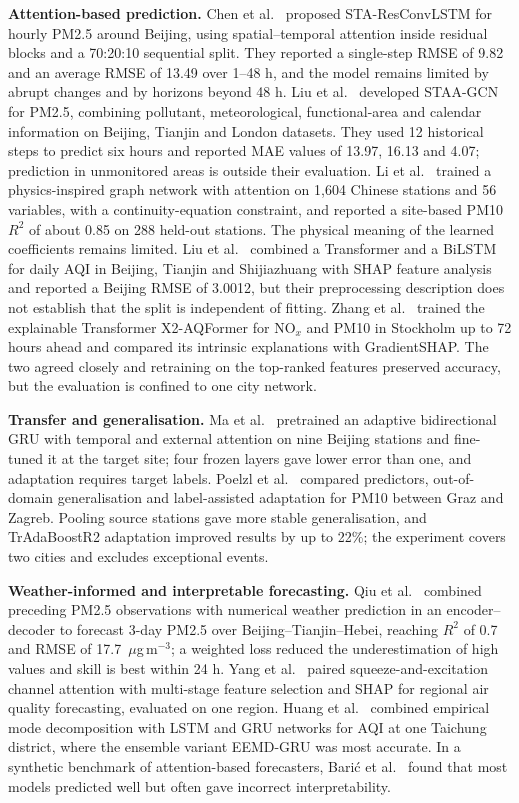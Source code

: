 \documentclass[pdflatex,sn-mathphys-num]{sn-jnl}
\begin{document}
\textbf{Attention-based prediction.} Chen et al.~\cite{chen23} proposed STA-ResConvLSTM for hourly PM2.5 around Beijing, using spatial--temporal attention inside residual blocks and a 70:20:10 sequential split. They reported a single-step RMSE of 9.82 and an average RMSE of 13.49 over 1--48 h, and the model remains limited by abrupt changes and by horizons beyond 48 h. Liu et al.~\cite{liu23} developed STAA-GCN for PM2.5, combining pollutant, meteorological, functional-area and calendar information on Beijing, Tianjin and London datasets. They used 12 historical steps to predict six hours and reported MAE values of 13.97, 16.13 and 4.07; prediction in unmonitored areas is outside their evaluation. Li et al.~\cite{li} trained a physics-inspired graph network with attention on 1,604 Chinese stations and 56 variables, with a continuity-equation constraint, and reported a site-based PM10 $R^2$ of about 0.85 on 288 held-out stations. The physical meaning of the learned coefficients remains limited. Liu et al.~\cite{liu25} combined a Transformer and a BiLSTM for daily AQI in Beijing, Tianjin and Shijiazhuang with SHAP feature analysis and reported a Beijing RMSE of 3.0012, but their preprocessing description does not establish that the split is independent of fitting. Zhang et al.~\cite{zhang} trained the explainable Transformer X2-AQFormer for NO$_x$ and PM10 in Stockholm up to 72 hours ahead and compared its intrinsic explanations with GradientSHAP. The two agreed closely and retraining on the top-ranked features preserved accuracy, but the evaluation is confined to one city network.

\textbf{Transfer and generalisation.} Ma et al.~\cite{ma} pretrained an adaptive bidirectional GRU with temporal and external attention on nine Beijing stations and fine-tuned it at the target site; four frozen layers gave lower error than one, and adaptation requires target labels. Poelzl et al.~\cite{poelzl} compared predictors, out-of-domain generalisation and label-assisted adaptation for PM10 between Graz and Zagreb. Pooling source stations gave more stable generalisation, and TrAdaBoostR2 adaptation improved results by up to 22\%; the experiment covers two cities and excludes exceptional events.

\textbf{Weather-informed and interpretable forecasting.} Qiu et al.~\cite{ppn} combined preceding PM2.5 observations with numerical weather prediction in an encoder--decoder to forecast 3-day PM2.5 over Beijing--Tianjin--Hebei, reaching $R^2$ of 0.7 and RMSE of 17.7~$\mu$g\,m$^{-3}$; a weighted loss reduced the underestimation of high values and skill is best within 24 h. Yang et al.~\cite{yang} paired squeeze-and-excitation channel attention with multi-stage feature selection and SHAP for regional air quality forecasting, evaluated on one region. Huang et al.~\cite{huang} combined empirical mode decomposition with LSTM and GRU networks for AQI at one Taichung district, where the ensemble variant EEMD-GRU was most accurate. In a synthetic benchmark of attention-based forecasters, Bari\'c et al.~\cite{entropy} found that most models predicted well but often gave incorrect interpretability.
\end{document}
